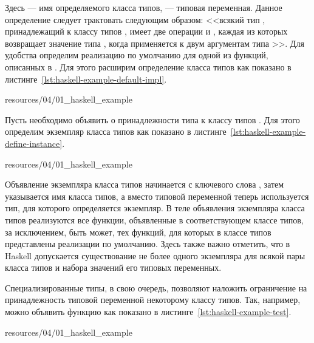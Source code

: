 Здесь  --- имя определяемого класса типов,  --- типовая переменная. Данное определение следует трактовать следующим образом: <<всякий тип , принадлежащий к классу типов , имеет две операции  и , каждая из которых возвращает значение типа , когда применяется к двум аргументам типа >>. Для удобства определим реализацию по умолчанию для одной из функций, описанных в . Для этого расширим определение класса типов  как показано в листинге~\ref{lst:haskell-example-default-impl}.


{resources/04/01_haskell_example}

Пусть необходимо объявить о принадлежности типа  к классу типов . Для этого определим экземпляр класса типов  как показано в листинге~\ref{lst:haskell-example-define-instance}.


{resources/04/01_haskell_example}

Объявление экземпляра класса типов начинается с ключевого слова , затем указывается имя класса типов, а вместо типовой переменной  теперь используется тип, для которого определяется экземпляр. В теле объявления экземпляра класса типов реализуются все функции, объявленные в соответствующем классе типов, за исключением, быть может, тех функций, для которых в классе типов представлены реализации по умолчанию. Здесь также важно отметить, что в Haskell допускается существование не более одного экземпляра для всякой пары класса типов и набора значений его типовых переменных. 

Специализированные типы, в свою очередь, позволяют наложить ограничение на принадлежность типовой переменной некоторому классу типов. Так, например, можно объявить функцию  как показано в листинге~\ref{lst:haskell-example-test}. 


{resources/04/01_haskell_example}

